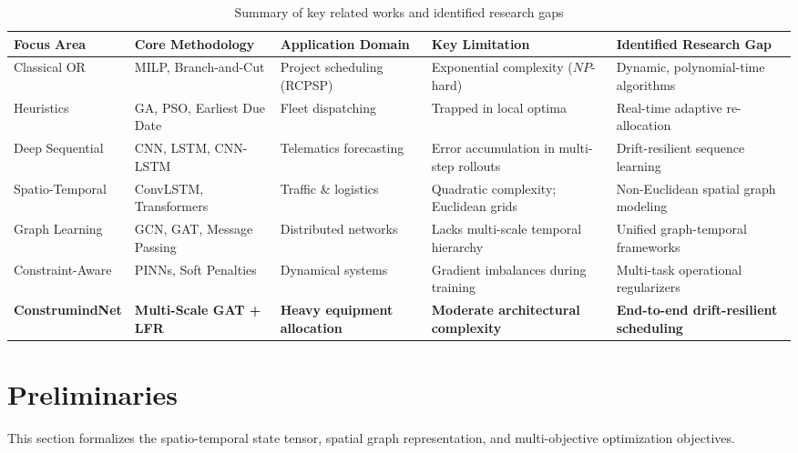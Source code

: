 \documentclass[11pt,a4paper]{article}
\begin{document}
\begin{table}[t]
\centering
\small
\caption{Summary of key related works and identified research gaps}\label{tab:related}
\begin{tabularx}{\textwidth}{l p{3.2cm} p{2.8cm} p{2.8cm} X}
\toprule
\textbf{Focus Area} & \textbf{Core Methodology} & \textbf{Application Domain} & \textbf{Key Limitation} & \textbf{Identified Research Gap} \\
\midrule
Classical OR \cite{hossain2025,meng2025} & MILP, Branch-and-Cut & Project scheduling (RCPSP) & Exponential complexity ($NP$-hard) & Dynamic, polynomial-time algorithms \\
Heuristics \cite{ejiyi2025,nguyen2024} & GA, PSO, Earliest Due Date & Fleet dispatching & Trapped in local optima & Real-time adaptive re-allocation \\
Deep Sequential \cite{russo2025,inam2024} & CNN, LSTM, CNN-LSTM & Telematics forecasting & Error accumulation in multi-step rollouts & Drift-resilient sequence learning \\
Spatio-Temporal \cite{shin2023,li2025} & ConvLSTM, Transformers & Traffic \& logistics & Quadratic complexity; Euclidean grids & Non-Euclidean spatial graph modeling \\
Graph Learning \cite{hussain2023,liu2025} & GCN, GAT, Message Passing & Distributed networks & Lacks multi-scale temporal hierarchy & Unified graph-temporal frameworks \\
Constraint-Aware \cite{meng2025,cuomo2022} & PINNs, Soft Penalties & Dynamical systems & Gradient imbalances during training & Multi-task operational regularizers \\
\midrule
\textbf{ConstrumindNet} & \textbf{Multi-Scale GAT + LFR} & \textbf{Heavy equipment allocation} & \textbf{Moderate architectural complexity} & \textbf{End-to-end drift-resilient scheduling} \\
\bottomrule
\end{tabularx}
\end{table}

\section{Preliminaries}\label{sec:prelim}
This section formalizes the spatio-temporal state tensor, spatial graph representation, and multi-objective optimization objectives.
\end{document}
